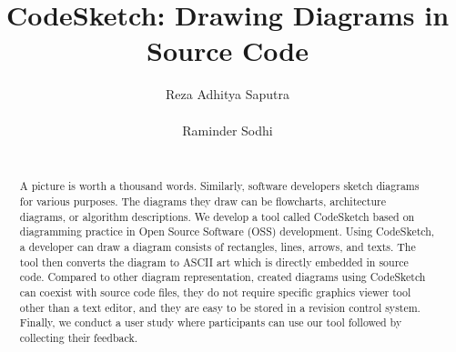 \documentclass{sig-alternate}
\begin{document}
%

\title{CodeSketch: Drawing Diagrams in Source Code} 


\author{
\alignauthor
Reza Adhitya Saputra\\
       \\
\alignauthor
Raminder Sodhi\\
       \\
}


\maketitle
\begin{abstract}
\label{abstract}


A picture is worth a thousand words. Similarly, software developers sketch diagrams for various purposes.  The diagrams they draw can be flowcharts, architecture diagrams, or algorithm descriptions. We develop a tool called CodeSketch based on diagramming practice in Open Source Software (OSS) development. Using CodeSketch, a developer can draw a diagram consists of rectangles, lines, arrows, and texts. The tool then converts the diagram to ASCII art which is directly embedded in source code. Compared to other diagram representation, created diagrams using CodeSketch can coexist with source code files, they do not require specific graphics viewer tool other than a text editor, and they are easy to be stored in a revision control system. Finally, we conduct a user study where participants can use our tool followed by collecting their feedback.

\end{abstract}

%

\end{document}
